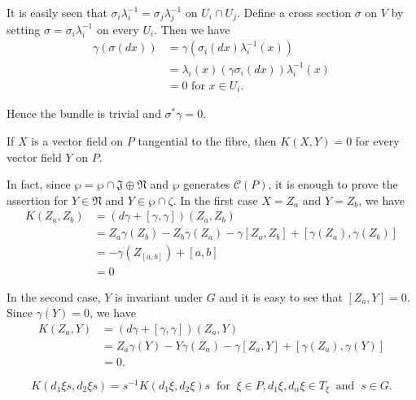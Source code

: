 It is easily seen that $\sigma_i \lambda^{-1}_i = \sigma_j
\lambda^{-1}_j$ on $U_i \cap U_j$. Define a cross section $\sigma$ on
$V$ by setting $\sigma = \sigma_i \lambda^{-1}_i$ on every $U_i$. Then
we have 
\begin{align*}
  \gamma (\sigma(dx)) & = \gamma(\sigma_i(dx)\lambda^{-1}_i (x))\\
  & = \lambda_i (x) (\gamma \sigma_i(dx)) \lambda^{-1}_i (x)\\
  & = 0 \text{ for } x \in U_i.
\end{align*}

Hence the bundle is trivial and $\sigma^* \gamma = 0$.

\begin{proposition}\label{chap3:sec6:prop3}%
  If $X$ is a vector field on $P$ tangential to the fibre, then\pageoriginale
  $K(X,Y) = 0$ for every vector field $Y$ on $P$. 
\end{proposition}

In fact, since $\wp = \wp \cap \mathfrak{J}\oplus \mathfrak{N}$ and
$\wp$ generates $\mathscr{C}(P)$, it is enough to prove the assertion
for $Y \in \mathfrak{N}$ and $Y \in \wp \cap \zeta$. In the first case
$X = Z_a $ and $Y = Z_b$, we have 
\begin{align*}
  K(Z_a,Z_b) & = (d \gamma + [\gamma,\gamma]) (Z_a,Z_b)\\
  & = Z_a \gamma (Z_b) - Z_b \gamma (Z_a) - \gamma [Z_a,Z_b] +
  [\gamma(Z_a),\gamma(Z_b)]\\ 
  & = - \gamma (Z_{[a,b]}) + [a,b]\\
  & = 0
\end{align*}

In the second case, $Y$ is invariant under $G$ and it is easy to see
that $[Z_a,Y] = 0$. Since $\gamma(Y)= 0$, we have 
\begin{align*}
  K(Z_a,Y) & = (d \gamma + [\gamma,\gamma]) (Z_a,Y)\\
  & = Z_a \gamma(Y) - Y \gamma(Z_a) - \gamma[Z_a,Y] + [ \gamma(Z_a),
    \gamma(Y)]\\ 
  & = 0.
\end{align*}

\begin{proposition}\label{chap3:sec6:prop4}%
  $$
  K (d_1 \xi s, d_2 \xi s) = s^{-1} K(d_1 \xi,d_2 \xi)s ~\text{ for }~
  \xi \in P, d_1 \xi, d_\alpha \xi  \in T_\xi ~\text{ and }~ s \in G. 
  $$
\end{proposition}

